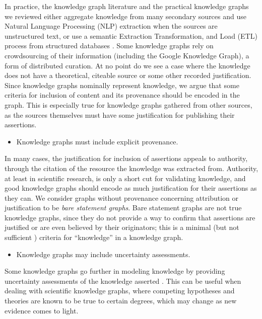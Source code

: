 \documentclass[runningheads,a4paper]{llncs}
\begin{document}
In practice, the knowledge graph literature and the practical knowledge graphs we reviewed either aggregate knowledge from many secondary sources and use Natural Language Processing (NLP) extraction when the sources are unstructured text, or use a semantic Extraction Transformation, and Load (ETL) process from structured databases \cite{McCusker_2009}.
Some knowledge graphs rely on crowdsourcing of their information (including the Google Knowledge Graph), a form of distributed curation.
At no point do we see a case where the knowledge does not have a theoretical, citeable source or some other recorded justification.
Since knowledge graphs nominally represent knowledge, we argue that some criteria for inclusion of content and its provenance should be encoded in the graph.
This is especially true for knowledge graphs gathered from other sources, as the sources themselves must have some justification for publishing their assertions.
\begin {itemize}
\item Knowledge graphs must include explicit provenance.
\end {itemize}
In many cases, the justification for inclusion of assertions appeals to authority, through the citation of the resource the knowledge was extracted from.
Authority, at least in scientific research, is only a short cut for validating knowledge, and good knowledge graphs should encode as much justification for their assertions as they can.
We consider graphs without provenance concerning attribution or justification to be {\em bare statement graphs}. Bare statement graphs are not true knowledge graphs, since they do not provide a way to confirm that assertions are justified or are even believed by their originators; this is a minimal (but not sufficient \cite{Gettier_1963}) criteria for ``knowledge'' in a knowledge graph.

\begin {itemize}
\item Knowledge graphs may include uncertainty assessments.
\end {itemize}

Some knowledge graphs go further in modeling knowledge by providing uncertainty assessments of the knowledge asserted \cite{Dong_2014}.
This can be useful when dealing with scientific knowledge graphs, where competing hypotheses and theories are known to be true to certain degrees, which may change as new evidence comes to light.
\end{document}
